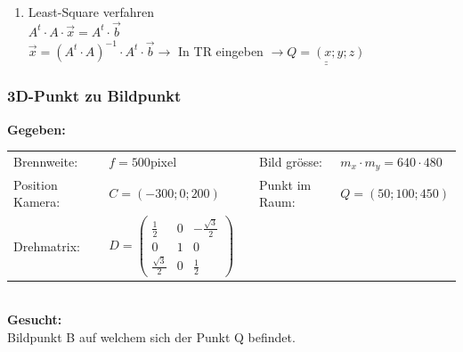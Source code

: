\begin{enumerate}
	\item Least-Square verfahren\\[0.2cm]
		$A^t \cdot A \cdot \vec{x} = A^t \cdot \vec{b}$\\
		$\vec{x}=(A^t \cdot A)^{-1} \cdot A^t \cdot \vec{b} \rightarrow$ In TR eingeben $\rightarrow \underline{\underline{Q=(x;y;z)}}$ 
\end{enumerate}


\subsubsection{3D-Punkt zu Bildpunkt}
\textbf{Gegeben:}\\
\begin{tabular}{llcll}
	Brennweite: & $f=500$pixel &\quad& Bild grösse: & $m_x \cdot m_y =640 \cdot 480$\\
	Position Kamera: & $C=(-300;0;200)$ && Punkt im Raum: & $Q=(50;100;450)$\\
	Drehmatrix: &$D=\left(\begin{array}{ccc} 
	\frac 1 2 & 0 & -\frac{\sqrt{3}}{2}\\
	0 & 1 & 0\\
	\frac{\sqrt{3}}{2} & 0 & \frac{1}{2} 
	\end{array}\right)  $
\end{tabular}\\[0.2cm]
\textbf{Gesucht:}\\
Bildpunkt B auf welchem sich der Punkt Q befindet.\\
